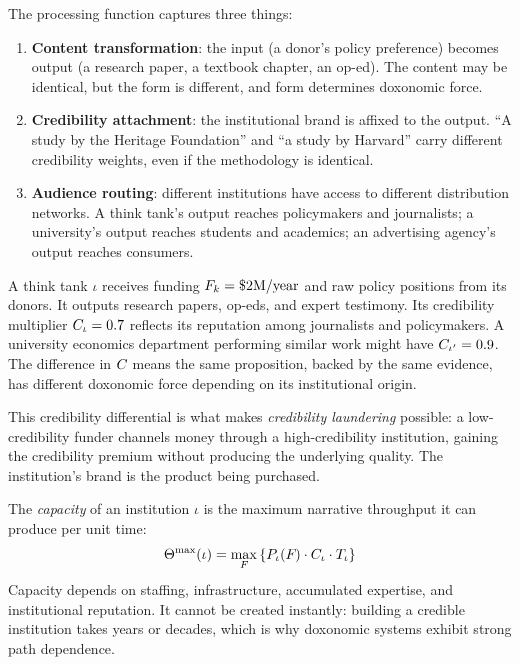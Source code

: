 The processing function captures three things:
\begin{enumerate}[nosep]
  \item \textbf{Content transformation}: the input (a donor's policy preference) becomes output (a research paper, a textbook chapter, an op-ed). The content may be identical, but the form is different, and form determines doxonomic force.
  \item \textbf{Credibility attachment}: the institutional brand is affixed to the output. ``A study by the Heritage Foundation'' and ``a study by Harvard'' carry different credibility weights, even if the methodology is identical.
  \item \textbf{Audience routing}: different institutions have access to different distribution networks. A think tank's output reaches policymakers and journalists; a university's output reaches students and academics; an advertising agency's output reaches consumers.
\end{enumerate}

\begin{example}
\label{ex:think-tank-credibility}
A think tank $\iota$ receives funding $F_{k} = \$2\text{M/year}$ and raw policy positions from its donors.
It outputs research papers, op-eds, and expert testimony.
Its credibility multiplier $C_{\iota} = 0.7$ reflects its reputation among journalists and policymakers.
A university economics department performing similar work might have $C_{\iota'} = 0.9$.
The difference in $C_{}$ means the same proposition, backed by the same evidence, has different doxonomic force depending on its institutional origin.

This credibility differential is what makes \emph{credibility laundering} possible: a low-credibility funder channels money through a high-credibility institution, gaining the credibility premium without producing the underlying quality.
The institution's brand is the product being purchased.
\end{example}

\begin{definition}
\label{def:capacity}
The \emph{capacity} of an institution $\iota$ is the maximum narrative throughput it can produce per unit time:
\[
  \Theta^{\max}(\iota) = \max_{F_{}} \left\{ P_{\iota}(F_{}) \cdot C_{\iota} \cdot T_{\iota} \right\}
\]
Capacity depends on staffing, infrastructure, accumulated expertise, and institutional reputation.
It cannot be created instantly: building a credible institution takes years or decades, which is why doxonomic systems exhibit strong path dependence.
\end{definition}

